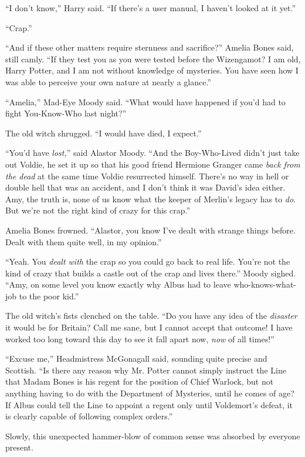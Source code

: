 ``I don't know,'' Harry said. ``If there's a user manual, I haven't looked at it yet.''

``Crap.''

``And if these other matters require sternness and sacrifice?'' Amelia Bones said, still camly. ``If they test you as you were tested before the Wizengamot? I am old, Harry Potter, and I am not without knowledge of mysteries. You have seen how I was able to perceive your own nature at nearly a glance.''

``Amelia,'' Mad-Eye Moody said. ``What would have happened if you'd had to fight You-Know-Who last night?''

The old witch shrugged. ``I would have died, I expect.''

``You'd have \emph{lost,}'' said Alastor Moody. ``And the Boy-Who-Lived didn't just take out Voldie, he set it up so that his good friend Hermione Granger came \emph{back from the dead} at the same time Voldie resurrected himself. There's no way in hell or double hell that was an accident, and I don't think it was David's idea either. Amy, the truth is, none of us know what the keeper of Merlin's legacy has to \emph{do}. But we're not the right kind of crazy for this crap.''

Amelia Bones frowned. ``Alastor, you know I've dealt with strange things before. Dealt with them quite well, in my opinion.''

``Yeah. You \emph{dealt with} the crap so you could go back to real life. You're not the kind of crazy that builds a castle out of the crap and lives there.'' Moody sighed. ``Amy, on some level you know exactly why Albus had to leave who-knows-what-job to the poor kid.''

The old witch's fists clenched on the table. ``Do you have any idea of the \emph{disaster} it would be for Britain? Call me sane, but I cannot accept that outcome! I have worked too long toward this day to see it fall apart now, \emph{now} of all times!''

``Excuse me,'' Headmistress McGonagall said, sounding quite precise and Scottish. ``Is there any reason why Mr. Potter cannot simply instruct the Line that Madam Bones is his regent for the position of Chief Warlock, but not anything having to do with the Department of Mysteries, until he comes of age? If Albus could tell the Line to appoint a regent only until Voldemort's defeat, it is clearly capable of following complex orders.''

Slowly, this unexpected hammer-blow of common sense was absorbed by everyone present.

